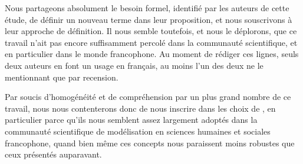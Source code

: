 Nous partageons absolument le besoin formel, identifié par les auteurs de cette étude, de définir un nouveau terme dans leur proposition, et nous souscrivons à leur approche de définition.
Il nous semble toutefois, et nous le déplorons, que ce travail n'ait pas encore suffisamment percolé dans la communauté scientifique, et en particulier dans le monde francophone.
Au moment de rédiger ces lignes, seuls deux auteurs en font un usage en français, au moins l'un des deux \autocite[89, 436]{rey-coyrehourcq_plateforme_2015} ne le mentionnant que par recension.

Par soucis d'homogénéité et de compréhension par un plus grand nombre de ce travail, nous nous contenterons donc de nous inscrire dans les choix de \textcite[voir \cref{enc:lexique-eval-amblard}]{amblard_evaluation_2006}, en particulier parce qu'ils nous semblent assez largement adoptés dans la communauté scientifique de modélisation en sciences humaines et sociales francophone, quand bien même ces concepts nous paraissent moins robustes que ceux présentés auparavant.


